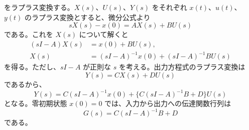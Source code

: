 \begin{derivation}
 をラプラス変換する。$X(s)$、$U(s)$、$Y(s)$ をそれぞれ $x(t)$、$u(t)$、$y(t)$ のラプラス変換とすると、微分公式より
\begin{equation}
  sX(s)-x(0)=AX(s)+BU(s)
\end{equation}
である。これを $X(s)$ について解くと
\begin{align}
  (sI-A)X(s)&=x(0)+BU(s),\\
  X(s)&=(sI-A)^{-1}x(0)+(sI-A)^{-1}BU(s)
\end{align}
を得る。ただし、$sI-A$ が正則な $s$ を考える。出力方程式のラプラス変換は
\begin{equation}
  Y(s)=CX(s)+DU(s)
\end{equation}
であるから、
\begin{equation}
  Y(s)=C(sI-A)^{-1}x(0)+\{C(sI-A)^{-1}B+D\}U(s)
  \label{eq:ss-laplace-with-initial}
\end{equation}
となる。零初期状態 $x(0)=0$ では、入力から出力への伝達関数行列は
\begin{equation}
  G(s)=C(sI-A)^{-1}B+D
  \label{eq:ss-transfer-function}
\end{equation}
である。
\end{derivation}


